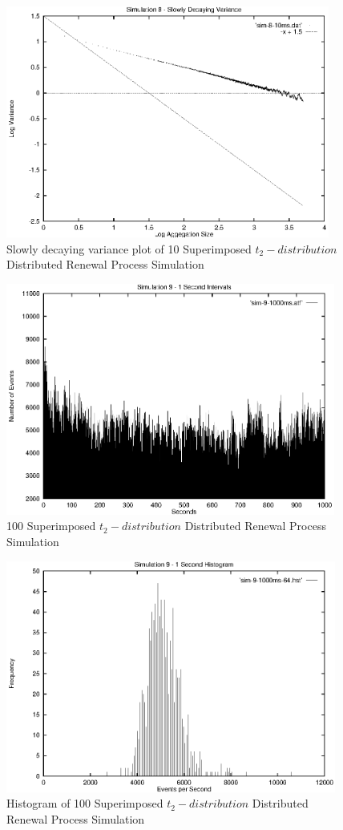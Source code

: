 \begin{figure}
\includegraphics[height=3in]{pics/sim-8-10ms-sta.eps}
\caption{Slowly decaying variance plot of 10 Superimposed $t_2-distribution$ Distributed Renewal Process Simulation}
\label{simulation:sim8.10ms.sta}
\end{figure}

\begin{figure}[h]
\includegraphics[height=3in]{pics/sim-9-1s-freq.eps}
\caption{100 Superimposed $t_2-distribution$ Distributed Renewal Process Simulation}
\label{simulation:sim9.1s.freq}
\end{figure}


\begin{figure}
\includegraphics[height=3in]{pics/sim-9-1s-hist-64.eps}
\caption{Histogram of 100 Superimposed $t_2-distribution$ Distributed Renewal Process Simulation}
\label{simulation:sim9.1s.hist}
\end{figure}

